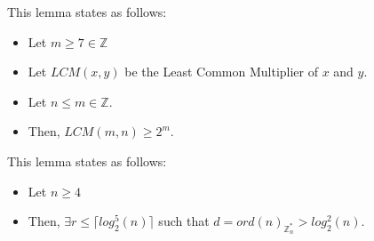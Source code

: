 \begin{lemma}\label{nair_lemma}
    This lemma states as follows:
    \begin{itemize}
        \item Let $m \geq 7 \in \mathbb{Z}$
        \item Let $LCM(x,y)$ be the Least Common Multiplier of $x$ and $y$.
        \item Let $n \leq m \in \mathbb{Z}$.
        \item Then, $LCM(m,n) \geq 2^{m}$.
    \end{itemize}
\end{lemma}

\begin{lemma}\label{aks_lemma}
    This lemma states as follows:
    \begin{itemize}
        \item Let $n \geq 4$
        \item Then, $\exists r \leq \lceil log_{2}^{5}(n) \rceil$ such that $d = ord(n)_{\mathbb{Z}_n^*} > log_2^2(n)$.
    \end{itemize}
\end{lemma}
